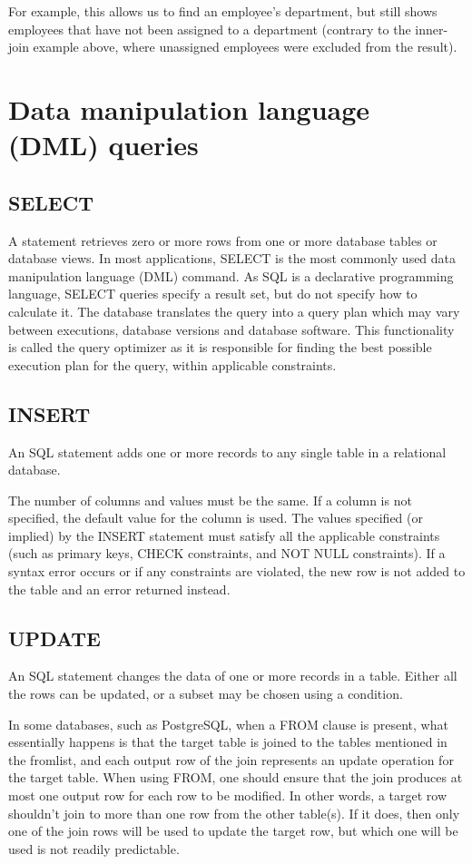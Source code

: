 \documentclass[10pt,twoside,english]{_support/latex/sbabook/sbabook}
\begin{document}
For example, this allows us to find an employee's department, but still shows
employees that have not been assigned to a department (contrary to the
inner-join example above, where unassigned employees were excluded from the
result).
\section{Data manipulation language (DML) queries}\subsection{SELECT}
A  statement retrieves zero or more rows from one
or more database tables or database views. In most applications, SELECT is the
most commonly used data manipulation language (DML) command. As SQL is a
declarative programming language, SELECT queries specify a result set, but do
not specify how to calculate it. The database translates the query into a query
plan which may vary between executions, database versions and database
software. This functionality is called the query optimizer as it is
responsible for finding the best possible execution plan for the query, within
applicable constraints.
\subsection{INSERT}
An SQL  statement adds one or more
records to any single table in a relational database.

The number of columns and values must be the same. If a column is not specified,
the default value for the column is used. The values specified (or implied) by
the INSERT statement must satisfy all the applicable constraints (such as
primary keys, CHECK constraints, and NOT NULL constraints). If a syntax error
occurs or if any constraints are violated, the new row is not added to the table
and an error returned instead.
\subsection{UPDATE}
An SQL  statement changes the data of one or more records in a
table. Either all the rows can be updated, or a subset may be chosen using a
condition.

In some databases, such as PostgreSQL, when a FROM clause is present, what
essentially happens is that the target table is joined to the tables mentioned
in the fromlist, and each output row of the join represents an update operation
for the target table. When using FROM, one should ensure that the join produces
at most one output row for each row to be modified. In other words, a target row
shouldn't join to more than one row from the other table(s). If it does, then
only one of the join rows will be used to update the target row, but which one
will be used is not readily predictable.
\end{document}
